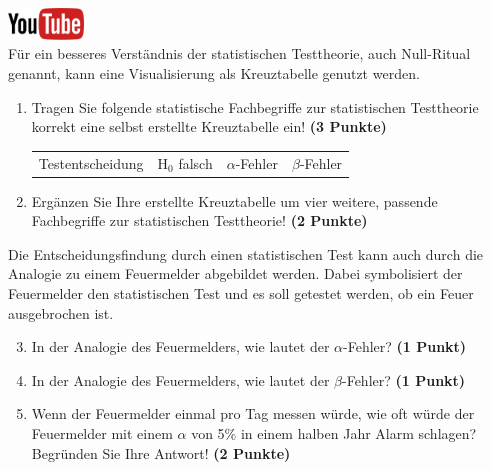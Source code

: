 \documentclass[a4paper, 9pt]{scrartcl}\usepackage[]{graphicx}\usepackage[]{xcolor}
\begin{document}
\hfill\href{https://youtu.be/Ric8ne39DtI}{\includegraphics[width =
  2cm]{img/youtube}}\\[1Ex]




F{\"u}r ein besseres Verst{\"a}ndnis der statistischen Testtheorie, auch
Null-Ritual genannt, kann eine Visualisierung als Kreuztabelle genutzt werden.  

\begin{enumerate}
\item Tragen Sie folgende statistische Fachbegriffe zur statistischen
  Testtheorie korrekt eine selbst erstellte Kreuztabelle ein! \textbf{(3
    Punkte)}
  \begin{center}
  \begin{tabular}{cccc}
  Testentscheidung & H$_0$ falsch & $\alpha$-Fehler & $\beta$-Fehler \\
  \end{tabular}
  \end{center}
\item Erg{\"a}nzen Sie Ihre erstellte Kreuztabelle um vier weitere, passende
  Fachbegriffe zur statistischen Testtheorie! \textbf{(2 Punkte)}
\end{enumerate}

Die Entscheidungsfindung durch einen statistischen Test kann auch durch die
Analogie zu einem Feuermelder abgebildet werden. Dabei symbolisiert der
Feuermelder den statistischen Test und es soll getestet werden, ob ein Feuer
ausgebrochen ist.

\begin{enumerate}
  \setcounter{enumi}{2}    
\item In der Analogie des Feuermelders, wie lautet der $\alpha$-Fehler? \textbf{(1 Punkt)}
\item In der Analogie des Feuermelders, wie lautet der $\beta$-Fehler? \textbf{(1 Punkt)}
\item Wenn der Feuermelder einmal pro Tag messen w{\"u}rde, wie oft w{\"u}rde der
  Feuermelder mit einem $\alpha$ von 5\% in einem halben Jahr Alarm schlagen?
  Begr{\"u}nden Sie Ihre Antwort! \textbf{(2 Punkte)}
\end{enumerate}
\end{document}
